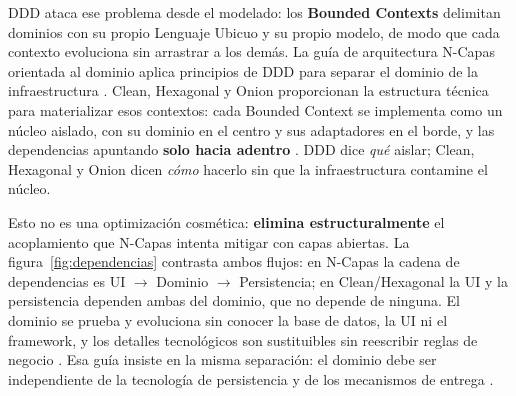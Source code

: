 DDD ataca ese problema desde el modelado: los \textbf{Bounded Contexts} delimitan dominios con su propio Lenguaje Ubicuo y su propio modelo, de modo que cada contexto evoluciona sin arrastrar a los demás. La guía de arquitectura N-Capas orientada al dominio aplica principios de DDD para separar el dominio de la infraestructura \parencite{torre2010guia}. Clean, Hexagonal y Onion proporcionan la estructura técnica para materializar esos contextos: cada Bounded Context se implementa como un núcleo aislado, con su dominio en el centro y sus adaptadores en el borde, y las dependencias apuntando \textbf{solo hacia adentro} \parencite{martin2017clean,cockburn2005hexagonal,palermo2008onion}. DDD dice \emph{qué} aislar; Clean, Hexagonal y Onion dicen \emph{cómo} hacerlo sin que la infraestructura contamine el núcleo.

Esto no es una optimización cosmética: \textbf{elimina estructuralmente} el acoplamiento que N-Capas intenta mitigar con capas abiertas. La figura~\ref{fig:dependencias} contrasta ambos flujos: en N-Capas la cadena de dependencias es UI $\rightarrow$ Dominio $\rightarrow$ Persistencia; en Clean/Hexagonal la UI y la persistencia dependen ambas del dominio, que no depende de ninguna. El dominio se prueba y evoluciona sin conocer la base de datos, la UI ni el framework, y los detalles tecnológicos son sustituibles sin reescribir reglas de negocio \parencite{martin2017clean,cockburn2005hexagonal,palermo2008onion}. Esa guía insiste en la misma separación: el dominio debe ser independiente de la tecnología de persistencia y de los mecanismos de entrega \parencite{torre2010guia}.

